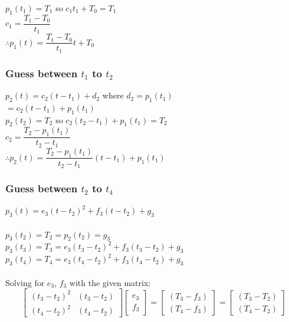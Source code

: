 \documentclass[12pt, titlepage]{article}
\begin{document}
		$p_1(t_1) = T_1$ so  $c_1t_1 + T_0 =T_1$\\
		$c_1 =\dfrac {T_1 - T_0}{t_1}$ \\

		$\therefore p_1(t) = \dfrac {T_1 - T_0}{t_1}t + T_0 $
	
	\subsubsection*{Guess between $t_1$ to $t_2$}
		$p_2(t) = c_2(t-t_1) + d_2$ where $d_2 = p_1(t_1)$ \\
		$=  c_2(t-t_1) +  p_1(t_1)$\\
		
		$p_2(t_2) = T_2$ so  $c_2(t_2 - t_1) + p_1(t_1) =T_2$\\
		$c_2 =\dfrac {T_2 - p_1(t_1)}{t_2 - t_1}$ \\

		$\therefore  p_2(t) = \dfrac {T_2 - p_1(t_1)}{t_2 - t_1}(t-t_1) +  p_1(t_1)$
	
	\subsubsection*{Guess between $t_2$ to $t_4$}
		$p_3(t) = e_3(t-t_2)^2 + f_3(t-t_2) + g_3$ \\\\
		$p_3(t_2) = T_2 = p_2(t_2) = g_3$\\
		$p_3(t_3) = T_3 = e_3(t_3-t_2)^2 + f_3(t_3-t_2) + g_3$\\
		$p_3(t_4) = T_4 = e_3(t_4-t_2)^2 + f_3(t_4-t_2) + g_3$\\\\

		Solving for $e_3$, $f_3$ with the given matrix:\\

		\[\begin{bmatrix} 
		(t_3 - t_2)^2 & (t_3 - t_2) \\
		(t_4 - t_2)^2 & (t_4 - t_2) 
		\end{bmatrix}
%
		\begin{bmatrix} 
		e_3 \\
		f_3 
		\end{bmatrix}	
%
		= 
%
		\begin{bmatrix} 
		(T_3 - f_3) \\
		(T_4 - f_3) 
		\end{bmatrix}
%
		=
%
		\begin{bmatrix} 
		(T_3 - T_2) \\
		(T_4 - T_2) 
		\end{bmatrix}\]
\end{document}

